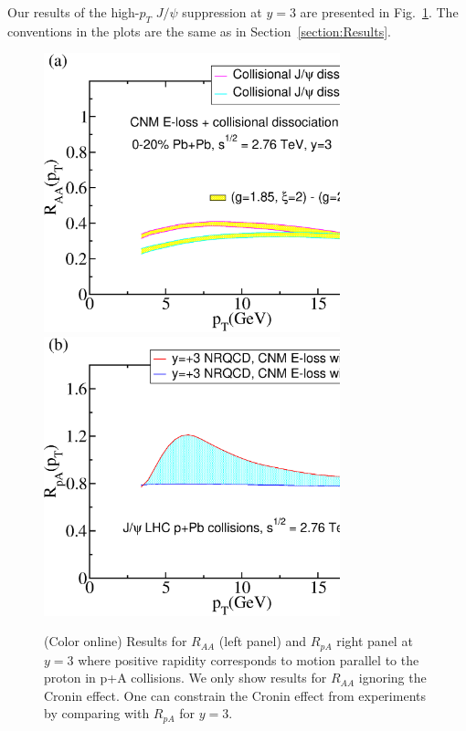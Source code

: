 \documentclass[article,showpacs,preprintnumbers,amsmath,amssymb]{revtex4}
\begin{document}
\begin{appendix}
Our results of the high-$p_T$  $J/\psi$ suppression  at $y=3$ are presented 
in Fig.~\ref{fig:y3}. The conventions in the plots are the same as in
Section~\ref{section:Results}. 

\begin{figure}[!ht]
\vspace*{.2in}
\includegraphics[width=3.38in,angle=0]{fig30_lhc2760y3pbpbraa.eps}
\includegraphics[width=3.38in,angle=0]{fig31_lhc2760y3ppb.eps} 
\caption{(Color online) Results for $R_{AA}$ (left panel) and $R_{pA}$ right panel at $y=3$
where positive rapidity corresponds to motion parallel to the proton in p+A
collisions.  We only show results for $R_{AA}$ ignoring the Cronin effect. One
can constrain the Cronin effect from experiments by comparing with $R_{pA}$ for
$y=3$.~\label{fig:y3}}
\end{figure}

\end{appendix}
\end{document}
